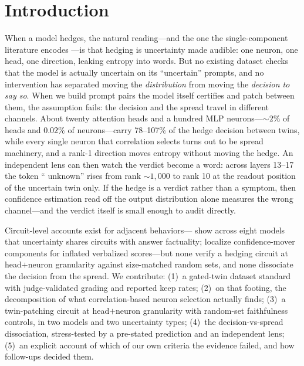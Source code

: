 \documentclass{article}
\begin{document}
\section{Introduction}
When a model hedges, the natural reading---and the one the single-component literature encodes
\citep{stolfo2024confidence,gurnee2024universal,roy2025unwanted,vazhentsev2026heads,ferrando2025iknow,ji2025hedging,anthropic2025biology}---is
that hedging is uncertainty made audible: one neuron, one head, one direction, leaking entropy into words.
But no existing dataset checks that the model is actually uncertain on its ``uncertain'' prompts, and no
intervention has separated moving the \emph{distribution} from moving the \emph{decision to say so}. When
we build prompt pairs the model itself certifies and patch between them, the assumption fails: the decision
and the spread travel in different channels. About twenty attention heads and a hundred MLP
neurons---${\sim}2\%$ of heads and $0.02\%$ of neurons---carry 78--107\% of the hedge decision between twins, while every single neuron that
correlation selects turns out to be spread machinery, and a rank-1 direction moves entropy without moving
the hedge. An independent lens can then watch the verdict become a word: across layers 13--17 the token
`` unknown'' rises from rank ${\sim}1{,}000$ to rank 10 at the readout position of the uncertain twin only.
If the hedge is a verdict rather than a symptom, then confidence estimation read off the output distribution
alone measures the wrong channel---and the verdict itself is small enough to audit directly.

Circuit-level accounts exist for adjacent behaviors---\citet{teplica2025sciurus} show across eight models
that uncertainty shares circuits with answer factuality; \citet{zhao2026wired} localize confidence-mover
components for inflated verbalized scores---but none verify a hedging circuit at head$+$neuron granularity
against size-matched random sets, and none dissociate the decision from the spread. We contribute:
(1)~a gated-twin dataset standard with judge-validated grading and reported keep rates; (2)~on that footing,
the decomposition of what correlation-based neuron selection actually finds; (3)~a twin-patching circuit at
head$+$neuron granularity with random-set faithfulness controls, in two models and two uncertainty types;
(4)~the decision-vs-spread dissociation, stress-tested by a pre-stated prediction and an independent lens;
(5)~an explicit account of which of our own criteria the evidence failed, and how follow-ups decided them.
\end{document}
